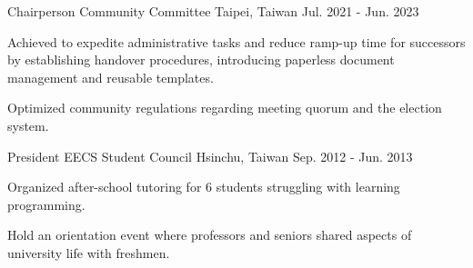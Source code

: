 

\begin{cventries}

  \cventry
    {Chairperson} %
    {Community Committee} %
    {Taipei, Taiwan} %
    {Jul. 2021 - Jun. 2023} %
    {
      \begin{cvitems} %
        \item {Achieved to expedite administrative tasks and reduce ramp-up
            time for successors by establishing handover procedures,
          introducing paperless document management and reusable templates.}
        \item {Optimized community regulations regarding meeting quorum and the
          election system.}
      \end{cvitems}
    }

  \cventry
    {President} %
    {EECS Student Council} %
    {Hsinchu, Taiwan} %
    {Sep. 2012 - Jun. 2013} %
    {
      \begin{cvitems} %
        \item Organized after-school tutoring for 6 students struggling with learning programming.
        \item Hold an orientation event where professors and seniors shared
          aspects of university life with freshmen.
      \end{cvitems}
    }

\end{cventries}
